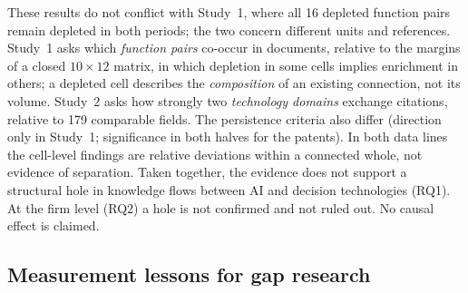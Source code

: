 These results do not conflict with Study~1, where all 16 depleted function pairs remain depleted in both periods; the two concern different units and references. Study~1 asks which \emph{function pairs} co-occur in documents, relative to the margins of a closed $10\times12$ matrix, in which depletion in some cells implies enrichment in others; a depleted cell describes the \emph{composition} of an existing connection, not its volume. Study~2 asks how strongly two \emph{technology domains} exchange citations, relative to 179 comparable fields. The persistence criteria also differ (direction only in Study~1; significance in both halves for the patents). In both data lines the cell-level findings are relative deviations within a connected whole, not evidence of separation. Taken together, the evidence does not support a structural hole in knowledge flows between AI and decision technologies (RQ1). At the firm level (RQ2) a hole is not confirmed and not ruled out. No causal effect is claimed.

\subsection{Measurement lessons for gap research}
\label{sec:discussion_measurement}

